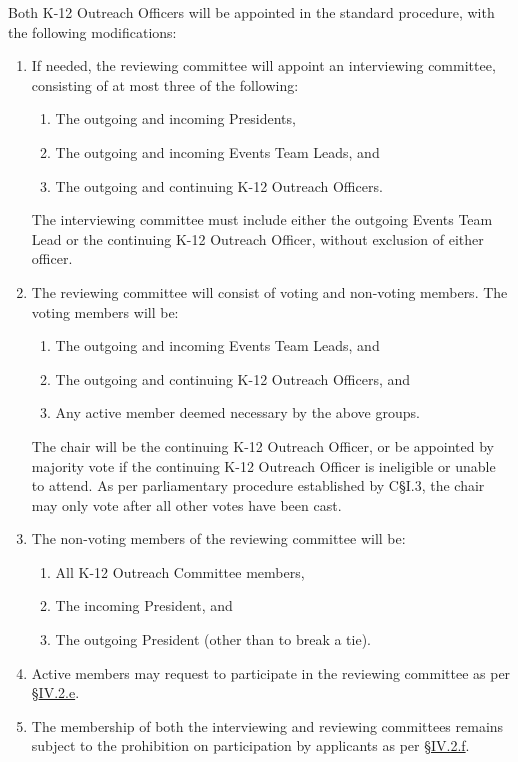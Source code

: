 Both K-12 Outreach Officers
will be appointed in the standard procedure, with the following modifications:
\begin{enumerate}
    \item If needed, the reviewing committee will appoint an interviewing committee, consisting
of at most three of the following:
    \begin{enumerate}
        \item The outgoing and incoming Presidents,
        \item The outgoing and incoming Events Team Leads, and
        \item The outgoing and continuing K-12 Outreach Officers.
    \end{enumerate}
    The interviewing committee must include either the outgoing Events Team Lead or
the continuing K-12 Outreach Officer, without exclusion of either officer.
    \item The reviewing committee will consist of voting and non-voting members. The voting
members will be:
    \begin{enumerate}
        \item The outgoing and incoming Events Team Leads, and
        \item The outgoing and continuing K-12 Outreach Officers, and
        \item Any active member deemed necessary by the above groups.
    \end{enumerate}
    The chair will be the continuing K-12 Outreach Officer, or be appointed by majority
vote if the continuing K-12 Outreach Officer is ineligible or unable to attend. As per
parliamentary procedure established by C§I.3, the chair may only vote after all other
votes have been cast.
    \item The non-voting members of the reviewing committee will be:
    \begin{enumerate}
        \item All K-12 Outreach Committee members,
        \item The incoming President, and
        \item The outgoing President (other than to break a tie).
    \end{enumerate}
    \item Active members may request to participate in the reviewing committee as per \S \hyperref[IV.2.e]{IV.2.e}.
    \item The membership of both the interviewing and reviewing committees remains subject
to the prohibition on participation by applicants as per \S \hyperref[IV.2.f]{IV.2.f}.
\end{enumerate}


